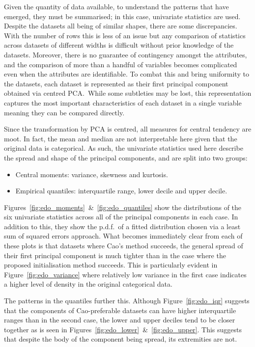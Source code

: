 Given the quantity of data available, to understand the patterns that have
emerged, they must be summarised; in this case, univariate statistics are used.
Despite the datasets all being of similar shapes, there are some discrepancies.
With the number of rows this is less of an issue but any comparison of
statistics across datasets of different widths is difficult without prior
knowledge of the datasets. Moreover, there is no guarantee of contingency
amongst the attributes, and the comparison of more than a handful of variables
becomes complicated even when the attributes are identifiable. To combat this
and bring uniformity to the datasets, each dataset is represented as their first
principal component obtained via centred PCA.\ While some subtleties may be
lost, this representation captures the most important characteristics of each
dataset in a single variable meaning they can be compared directly.

Since the transformation by PCA is centred, all measures for central tendency
are moot. In fact, the mean and median are not interpretable here given that the
original data is categorical. As such, the univariate statistics used here
describe the spread and shape of the principal components, and are split into
two groups:
\begin{itemize}
    \item Central moments: variance, skewness and kurtosis.
    \item Empirical quantiles: interquartile range, lower decile and upper
        decile.
\end{itemize}

Figures~\ref{fig:edo_moments}~\&~\ref{fig:edo_quantiles} show the distributions
of the six univariate statistics across all of the principal components in each
case.  In addition to this, they show the p.d.f.\ of a fitted distribution
chosen via a least sum of squared errors approach. What becomes immediately
clear from each of these plots is that datasets where Cao's method succeeds, the
general spread of their first principal component is much tighter than in the
case where the proposed initialisation method succeeds. This is particularly
evident in Figure~\ref{fig:edo_variance} where relatively low variance in the
first case indicates a higher level of density in the original categorical data.

The patterns in the quantiles further this. Although Figure~\ref{fig:edo_iqr}
suggests that the components of Cao-preferable datasets can have higher
interquartile ranges than in the second case, the lower and upper deciles tend
to be closer together as is seen in
Figures~\ref{fig:edo_lower}~\&~\ref{fig:edo_upper}. This suggests that despite
the body of the component being spread, its extremities are not.

